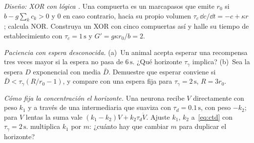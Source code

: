 \begin{exercise}[\lvlB]
\label{ex:05:6}
\emph{Diseño: XOR con lógica .} Una compuerta es un marcapasos que emite $r_0$ si $b-g\sum_kc_k>0$ y $0$ en caso contrario, hacia su propio volumen $\tau_c\,\dd c/\dd t=-c+\kappa r$; calcula NOR. Construya un XOR con cinco compuertas así y halle su tiempo de establecimiento con $\tau_c=1\,\text{s}$ y $G'=g\kappa r_0/b=2$.
\end{exercise}

\begin{exercise}[\lvlB]
\label{ex:05:7}
\emph{Paciencia con espera desconocida.} (a)~Un animal acepta esperar una recompensa tres veces mayor si la espera no pasa de $6\,\text{s}$. ¿Qué horizonte $\tau_\gamma$ implica? (b)~Sea la espera $D$ exponencial con media $\bar D$. Demuestre que esperar conviene si $\bar D<\tau_\gamma(R/r_0-1)$, y compare con una espera fija para $\tau_\gamma=2\,\text{s}$, $R=3r_0$.
\end{exercise}

\begin{exercise}[\lvlC]
\label{ex:05:8}
\emph{Cómo fija la concentración el horizonte.} Una neurona  recibe $V$ directamente con peso $k_1$ y a través de una intermediaria  que suaviza con $\tau_d=0.1\,\text{s}$, con peso $-k_2$; para $V$ lentas la suma vale $(k_1-k_2)V+k_2\tau_d\dot V$. Ajuste $k_1$, $k_2$ a~\eqref{eq:ctd} con $\tau_\gamma=2\,\text{s}$.  multiplica $k_1$ por $m$: ¿cuánto hay que cambiar $m$ para duplicar el horizonte?
\end{exercise}
